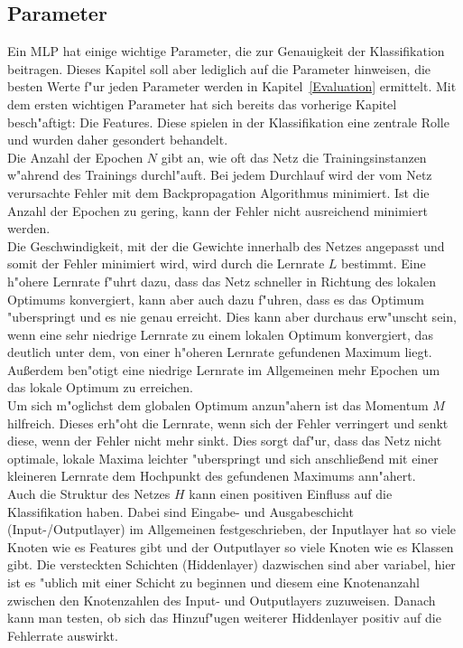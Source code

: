 \subsection{Parameter}
\label{Parameter}
Ein MLP hat einige wichtige Parameter, die zur Genauigkeit der Klassifikation beitragen. Dieses Kapitel soll aber lediglich auf die Parameter hinweisen, die besten Werte f"ur jeden Parameter werden in Kapitel~\ref{Evaluation} ermittelt. Mit dem ersten wichtigen Parameter hat sich bereits das vorherige Kapitel besch"aftigt: Die Features. Diese spielen in der Klassifikation eine zentrale Rolle und wurden daher gesondert behandelt.\\
Die Anzahl der Epochen $N$ gibt an, wie oft das Netz die Trainingsinstanzen w"ahrend des Trainings durchl"auft. Bei jedem Durchlauf wird der vom Netz verursachte Fehler mit dem Backpropagation Algorithmus minimiert. Ist die Anzahl der Epochen zu gering, kann der Fehler nicht ausreichend minimiert werden. \\ %
Die Geschwindigkeit, mit der die Gewichte innerhalb des Netzes angepasst und somit der Fehler minimiert wird, wird durch die Lernrate $L$ bestimmt. Eine h"ohere Lernrate f"uhrt dazu, dass das Netz schneller in Richtung des lokalen Optimums konvergiert, kann aber auch dazu f"uhren, dass es das Optimum "uberspringt und es nie genau erreicht. Dies kann aber durchaus erw"unscht sein, wenn eine sehr niedrige Lernrate zu einem lokalen Optimum konvergiert, das deutlich unter dem, von einer h"oheren Lernrate gefundenen Maximum liegt. Au{\ss}erdem ben"otigt eine niedrige Lernrate im Allgemeinen mehr Epochen um das lokale Optimum zu erreichen. \\
Um sich m"oglichst dem globalen Optimum anzun"ahern ist das Momentum $M$ hilfreich. Dieses erh"oht die Lernrate, wenn sich der Fehler verringert und senkt diese, wenn der Fehler nicht mehr sinkt. Dies sorgt daf"ur, dass das Netz nicht optimale, lokale Maxima leichter "uberspringt und sich anschlie{\ss}end mit einer kleineren Lernrate dem Hochpunkt des gefundenen Maximums ann"ahert.\\
Auch die Struktur des Netzes $H$ kann einen positiven Einfluss auf die Klassifikation haben. Dabei sind Eingabe- und Ausgabeschicht (Input-/Outputlayer) im Allgemeinen festgeschrieben, der Inputlayer hat so viele Knoten wie es Features gibt und der Outputlayer so viele Knoten wie es Klassen gibt. Die versteckten Schichten (Hiddenlayer) dazwischen sind aber variabel, hier ist es "ublich mit einer Schicht zu beginnen und diesem eine Knotenanzahl zwischen den Knotenzahlen des Input- und Outputlayers zuzuweisen. Danach kann man testen, ob sich das Hinzuf"ugen weiterer Hiddenlayer positiv auf die Fehlerrate auswirkt.\\ %
